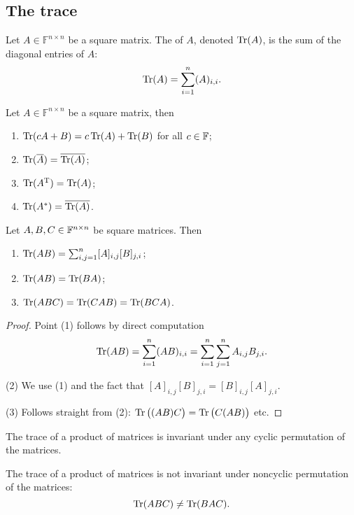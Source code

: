 \subsection{The trace}
\begin{definition}
Let $A\in \mathbb{F}^{n\times n}$ be a square matrix. The  of $A$, denoted $\operatorname{Tr}(A)$, is the sum of the diagonal entries of $A$:
\[ \operatorname{Tr}(A) = \sum_{i=1}^n (A)_{i,i}. \]
\end{definition}
\begin{proposition}
Let $A\in \mathbb{F}^{n\times n}$ be a square matrix, then
\begin{enumerate}
\item $\operatorname{Tr}(cA+B) = c\operatorname{Tr}(A) + \operatorname{Tr}(B)$ for all $c\in\mathbb{F}$;
\item $\operatorname{Tr}(\overline{A}) = \overline{\operatorname{Tr}(A)}$;
\item $\operatorname{Tr}(A^{\mathrm{T}}) = \operatorname{Tr}(A)$;
\item $\operatorname{Tr}(A^*) = \overline{\operatorname{Tr}(A)}$.
\end{enumerate}
\end{proposition}
\begin{proposition}
Let $A,B,C \in\mathbb{F}^{n\times n}$ be square matrices. Then
\begin{enumerate}
\item $\operatorname{Tr}(AB) = \sum_{i,j=1}^n [A]_{i,j}[B]_{j,i}$;
\item $\operatorname{Tr}(AB) = \operatorname{Tr}(BA)$;
\item $\operatorname{Tr}(ABC) = \operatorname{Tr}(CAB) = \operatorname{Tr}(BCA)$.
\end{enumerate}
\end{proposition}
\begin{proof}
Point (1) follows by direct computation
\[ \operatorname{Tr}(AB) = \sum_{i=1}^n (AB)_{i,i} = \sum_{i=1}^n\sum_{j=1}^n A_{i,j}B_{j,i}. \]

(2) We use (1) and the fact that $[A]_{i,j}[B]_{j,i} = [B]_{i,j}[A]_{j,i}$.

(3) Follows straight from (2): $\operatorname{Tr}\big((AB)C\big) = \operatorname{Tr}\big(C(AB)\big)$ etc.
\end{proof}
The trace of a product of matrices is invariant under any cyclic permutation of the matrices.

The trace of a product of matrices is not invariant under noncyclic permutation of the matrices:
\[ \operatorname{Tr}(ABC) \neq \operatorname{Tr}(BAC). \]




